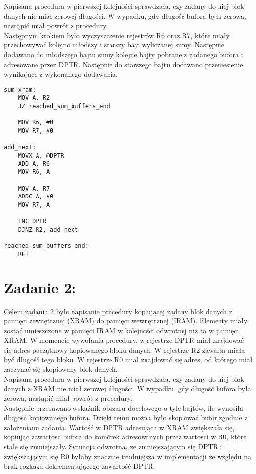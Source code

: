 \documentclass[a4paper,12pt]{article}
\begin{document}
\noindent
Napisana procedura w pierwszej kolejności sprawdzała, czy zadany do niej blok danych nie miał zerowej długości. W wypadku, gdy długość bufora była zerowa, nastąpić miał powrót z procedury.\\

\noindent
Następnym krokiem było wyczyszczenie rejestrów R6 oraz R7, które miały przechowywać kolejno młodszy i starszy bajt wyliczanej sumy. Następnie dodawano do młodszego bajtu sumy kolejne bajty pobrane z zadanego bufora i adresowane przez DPTR. Następnie do starszego bajtu dodawano przeniesienie wynikające z wykonanego dodawania.\\

\begin{lstlisting}[frame=single, basicstyle=\small, caption={Kod z zadania 1}, label={lst.zad1}]
sum_xram:
	MOV A, R2
	JZ reached_sum_buffers_end
	
	MOV R6, #0
	MOV R7, #0
	
add_next:
	MOVX A, @DPTR
	ADD A, R6
	MOV R6, A
	
	MOV A, R7
	ADDC A, #0
	MOV R7, A
	
	INC DPTR
	DJNZ R2, add_next

reached_sum_buffers_end:
	RET
\end{lstlisting}
\vspace{5mm}

\section{Zadanie 2:}
Celem zadania 2 było napisanie procedury kopiującej zadany blok danych z pamięci zewnętrznej (XRAM) do pamięci wewnętrznej (IRAM). Elementy miały zostać umieszczone w pamięci IRAM w kolejności odwrotnej niż ta w pamięci XRAM.  W momencie wywołania procedury, w rejestrze DPTR miał znajdować się adres początkowy kopiowanego bloku danych. W rejestrze R2 zawarta miała być długość tego bloku. W rejestrze R0 miał znajdować się adres, od którego miał zaczynać się skopiowany blok danych.\\

\noindent
Napisana procedura w pierwszej kolejności sprawdzała, czy zadany do niej blok danych z XRAM nie miał zerowej długości. W wypadku, gdy długość bufora była zerowa, nastąpić miał powrót z procedury.\\

\noindent
Następnie przesuwano wskaźnik obszaru docelowego o tyle bajtów, ile wynosiła długość kopiowanego bufora. Dzięki temu można było skopiować bufor zgodnie z założeniami zadania. Wartość w DPTR adresująca w XRAM zwiększała się, kopiując zawartość bufora do komórek adresowanych przez wartości w R0, które stale się zmniejszały. Sytuacja odwrotna, ze zmniejszającym się DPTR i zwiększającym się R0 byłaby znacznie trudniejsza w implementacji ze względu na brak rozkazu dekrementującego zawartość DPTR.\\
\end{document}
